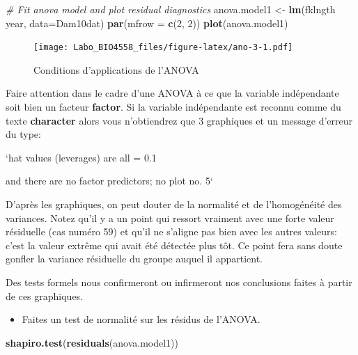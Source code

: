 \documentclass[12pt,]{book}
\makeatletter
\newenvironment{Shaded}{\begin{snugshade}}{\end{snugshade}}
\newcommand{\CommentTok}[1]{\textcolor[rgb]{0.56,0.35,0.01}{\textit{#1}}}
\newcommand{\DataTypeTok}[1]{\textcolor[rgb]{0.13,0.29,0.53}{#1}}
\newcommand{\DecValTok}[1]{\textcolor[rgb]{0.00,0.00,0.81}{#1}}
\newcommand{\KeywordTok}[1]{\textcolor[rgb]{0.13,0.29,0.53}{\textbf{#1}}}
\newcommand{\NormalTok}[1]{#1}
\newcommand{\OperatorTok}[1]{\textcolor[rgb]{0.81,0.36,0.00}{\textbf{#1}}}
\newcommand{\StringTok}[1]{\textcolor[rgb]{0.31,0.60,0.02}{#1}}
\providecommand{\tightlist}{%
  \setlength{\itemsep}{0pt}\setlength{\parskip}{0pt}}
\newenvironment{kframe}{%
\medskip{}
\setlength{\fboxsep}{.8em}
\def\at@end@of@kframe{}%
\ifinner\ifhmode%
 \def\at@end@of@kframe{\end{minipage}}%
 \begin{minipage}{\columnwidth}%
\fi\fi%
\def\FrameCommand##1{\hskip\@totalleftmargin \hskip-\fboxsep
\colorbox{incolor}{##1}\hskip-\fboxsep
    \hskip-\linewidth \hskip-\@totalleftmargin \hskip\columnwidth}%
\MakeFramed {\advance\hsize-\width
  \@totalleftmargin\z@ \linewidth\hsize
  \@setminipage}}%
{\par\unskip\endMakeFramed%
\at@end@of@kframe}
\newenvironment{rmdblock}[1]
 {
 \begin{itemize}
 \renewcommand{\labelitemi}{
   \raisebox{-.7\height}[0pt][0pt]{
     {\setkeys{Gin}{width=3em,keepaspectratio}\texttt{[image: images/\#1]}}
   }
 }
 \begin{kframe}
 \setlength{\fboxsep}{1em}
 \item
 }
 {
 \end{kframe}
 \end{itemize}
 }
\newenvironment{rmdwarning}
  {\begin{rmdblock}{warning}}
  {\end{rmdblock}}
\makeatother
\begin{document}
\begin{Shaded}
\begin{Highlighting}[]
\CommentTok{# Fit anova model and plot residual diagnostics}
\NormalTok{anova.model1 <-}\StringTok{ }\KeywordTok{lm}\NormalTok{(fklngth }\OperatorTok{~}\StringTok{ }\NormalTok{year, }\DataTypeTok{data=}\NormalTok{Dam10dat)}
\KeywordTok{par}\NormalTok{(}\DataTypeTok{mfrow =} \KeywordTok{c}\NormalTok{(}\DecValTok{2}\NormalTok{, }\DecValTok{2}\NormalTok{))}
\KeywordTok{plot}\NormalTok{(anova.model1)}
\end{Highlighting}
\end{Shaded}

\begin{figure}
\centering
\texttt{[image: Labo\_BIO4558\_files/figure-latex/ano-3-1.pdf]}
\caption{\label{fig:ano-3}Conditions d'applications de l'ANOVA}
\end{figure}

\begin{rmdwarning}
Faire attention dans le cadre d'une ANOVA à ce que la variable indépendante soit bien un facteur \textbf{factor}. Si la variable indépendante est reconnu comme du texte \textbf{character} alors vous n'obtiendrez que 3 graphiques et un message d'erreur du type:

`hat values (leverages) are all = 0.1

and there are no factor predictors; no plot no. 5`
\end{rmdwarning}

D'après les graphiques, on peut douter de la normalité et de l'homogénéité des variances. Notez qu'il y a un point qui ressort vraiment avec une forte valeur résiduelle (cas numéro 59) et qu'il ne s'aligne pas bien avec les autres valeurs: c'est la valeur extrême qui avait été détectée plus tôt. Ce point fera sans doute gonfler la variance résiduelle du groupe auquel il appartient.

Des tests formels nous confirmeront ou infirmeront nos conclusions faites à partir de ces graphiques.

\begin{itemize}
\tightlist
\item
  Faites un test de normalité sur les résidus de l'ANOVA.
\end{itemize}

\begin{Shaded}
\begin{Highlighting}[]
\KeywordTok{shapiro.test}\NormalTok{(}\KeywordTok{residuals}\NormalTok{(anova.model1))}
\end{Highlighting}
\end{Shaded}
\end{document}
